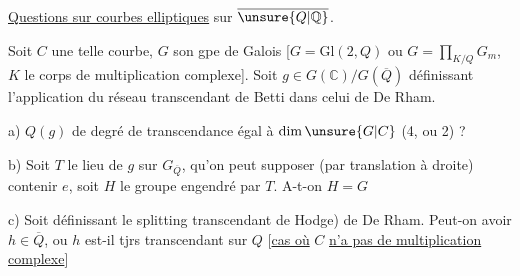 \uline{Questions sur courbes elliptiques} sur $\overline{\unsure{Q|\mathbb Q}}$.

Soit $C$ une telle courbe, $G$ son gpe de Galois  [$G=\mathrm{Gl}(2,Q)$ ou $G=\prod_{K/Q}G_m$, $K$ le corps de multiplication complexe]. Soit $g\in G(\mathbb C)/G(\overline Q)$ définissant l'application du réseau transcendant de Betti dans celui de De Rham.

a) $Q(g)$ de degré de transcendance égal à $\dim\unsure{G|C}$ (4, ou 2) ?

b) Soit $T$ le lieu de $g$ sur $G_{\overline Q}$,  qu'on peut supposer (par translation à droite) contenir $e$,  soit $H$ le groupe engendré  par $T$.  A-t-on $H=G$

c) Soit  \inserted{$h\in\mathbb C/\overline Q$ [quotient additif)} définissant le splitting transcendant  de Hodge) de De Rham. Peut-on avoir $h\in\overline Q$, ou $h$ est-il tjrs transcendant sur $Q$
[\uline{cas où} $C$ \uline{n'a pas de multiplication complexe}]
